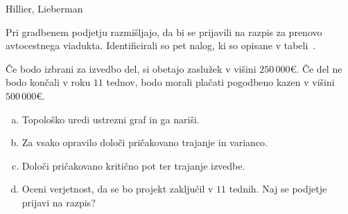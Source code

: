 \begin{naloga}{Hillier, Lieberman}{\cite[Problem~10.4-4]{hl}}
\begin{vprasanje}
Pri gradbenem podjetju razmišljajo,
da bi se prijavili na razpis za prenovo av\-to\-cest\-ne\-ga viadukta.
Identificirali so pet nalog, ki so opisane v tabeli~\tab.

Če bodo izbrani za izvedbo del, si obetajo zaslužek v višini $250\,000 €$.
Če del ne bodo končali v roku $11$ tednov,
bodo morali plačati pogodbeno kazen v višini $500\,000 €$.
\begin{enumerate}[(a)]
\item Topološko uredi ustrezni graf in ga nariši.
\item Za vsako opravilo določi pričakovano trajanje in varianco.
\item Določi pričakovano kritično pot ter trajanje izvedbe.
\item Oceni verjetnost, da se bo projekt zaključil v $11$ tednih.
Naj se podjetje prijavi na razpis?
\end{enumerate}

\begin{tabela}
\end{tabela}
\end{vprasanje}
\begin{odgovor}
\end{odgovor}
\end{naloga}
